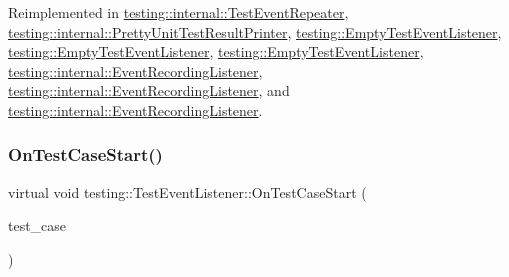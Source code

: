 Reimplemented in \mbox{\hyperlink{classtesting_1_1internal_1_1_test_event_repeater_a0a335e1c3957a8c699ed56e37ea7b978}{testing\+::internal\+::\+Test\+Event\+Repeater}}, \mbox{\hyperlink{classtesting_1_1internal_1_1_pretty_unit_test_result_printer_a7a62fe58fa6f6aace813eb62b31e5a51}{testing\+::internal\+::\+Pretty\+Unit\+Test\+Result\+Printer}}, \mbox{\hyperlink{classtesting_1_1_empty_test_event_listener_abe05cc74c1081ed51e2c84b73013299e}{testing\+::\+Empty\+Test\+Event\+Listener}}, \mbox{\hyperlink{classtesting_1_1_empty_test_event_listener_abe05cc74c1081ed51e2c84b73013299e}{testing\+::\+Empty\+Test\+Event\+Listener}}, \mbox{\hyperlink{classtesting_1_1_empty_test_event_listener_a6bec703158283104c4298f7d8a528515}{testing\+::\+Empty\+Test\+Event\+Listener}}, \mbox{\hyperlink{classtesting_1_1internal_1_1_event_recording_listener_a52788314427f5c7a4585ea0bf5f3c251}{testing\+::internal\+::\+Event\+Recording\+Listener}}, \mbox{\hyperlink{classtesting_1_1internal_1_1_event_recording_listener_a52788314427f5c7a4585ea0bf5f3c251}{testing\+::internal\+::\+Event\+Recording\+Listener}}, and \mbox{\hyperlink{classtesting_1_1internal_1_1_event_recording_listener_a4d0cb8a389c7339bce0aa6128291529f}{testing\+::internal\+::\+Event\+Recording\+Listener}}.

\mbox{\label{classtesting_1_1_test_event_listener_ab4ed885d63f5bbff8076c1329b3dfe36}} 
\subsubsection{\texorpdfstring{OnTestCaseStart()}{OnTestCaseStart()}\hspace{0.1cm}{\footnotesize\ttfamily [1/3]}}
{\footnotesize\ttfamily virtual void testing\+::\+Test\+Event\+Listener\+::\+On\+Test\+Case\+Start (\begin{DoxyParamCaption}\item[{const \mbox{\hyperlink{classtesting_1_1_test_case}{Test\+Case}} \&}]{test\+\_\+case }\end{DoxyParamCaption})\hspace{0.3cm}{\ttfamily [pure virtual]}}



